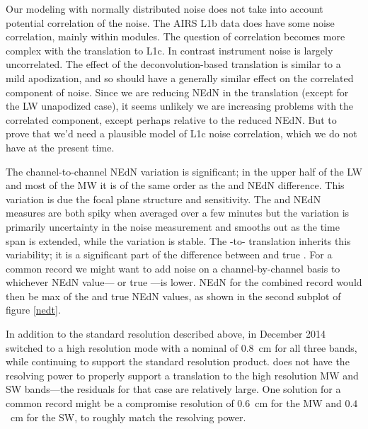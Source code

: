\documentclass[journal]{IEEEtran}
\begin{document}
Our modeling with normally distributed noise does not take into
account potential correlation of the {\airs} noise.  The AIRS L1b
data does have some noise correlation, mainly within modules.  The
question of correlation becomes more complex with the translation to
L1c.  In contrast {\cris} instrument noise is largely uncorrelated.
The effect of the deconvolution-based translation is similar to a
mild apodization, and so should have a generally similar effect on
the correlated component of {\airs} noise.  Since we are reducing
NEdN in the translation (except for the LW unapodized case), it
seems unlikely we are increasing problems with the correlated
component, except perhaps relative to the reduced NEdN.  But to
prove that we’d need a plausible model of L1c noise correlation,
which we do not have at the present time.


The {\airs} channel-to-channel NEdN variation is significant; in the
upper half of the LW and most of the MW it is of the same order as
the {\airs} and {\cris} NEdN difference.  This variation is due the
{\airs} focal plane structure and sensitivity.  The {\airs} and
{\cris} NEdN measures are both spiky when averaged over a few
minutes but the {\cris} variation is primarily uncertainty in the
noise measurement and smooths out as the time span is extended,
while the {\airs} variation is stable.  The {\airs}-to-{\cris}
translation inherits this variability; it is a significant part of
the difference between {\airs} {\cris} and true {\cris}.  For a
common record we might want to add noise on a channel-by-channel
basis to whichever NEdN value---{\airs} {\cris} or true {\cris}---is
lower.  NEdN for the combined record would then be max of the
{\airs} {\cris} and true {\cris} NEdN values, as shown in the second
subplot of figure \ref{nedt}.

In addition to the standard resolution described above, in December
2014 {\cris} switched to a high resolution mode with a nominal
{\opd} of $0.8$~cm for all three bands, while continuing to support
the standard resolution product.  {\airs} does not have the
resolving power to properly support a translation to the {\cris}
high resolution MW and SW bands---the residuals for that case are
relatively large.  One solution for a common record might be a
compromise {\cris} resolution of $0.6$~cm for the MW and $0.4$~cm
for the SW, to roughly match the {\airs} resolving power.
\end{document}
